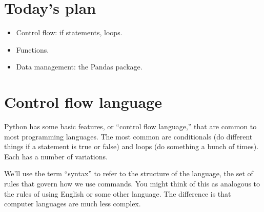 \documentclass[11pt]{article}
\begin{document}
\section{Today's plan}

\begin{itemize}
\item Control flow:  if statements, loops.
\item Functions.
\item Data management:  the Pandas package.
\end{itemize}


\section{Control flow language}

Python has some basic features, or ``control flow language,''
that are common to most programming languages.
The most common are conditionals
(do different things if a statement is true or false)
and loops (do something a bunch of times).
Each has a number of variations.

We'll use the term ``syntax'' to refer to the structure of the language,
the set of rules that govern how we use commands.
You might think of this as analogous to the rules of using English
or some other language.
The difference is that computer languages are much less complex.
\end{document}
